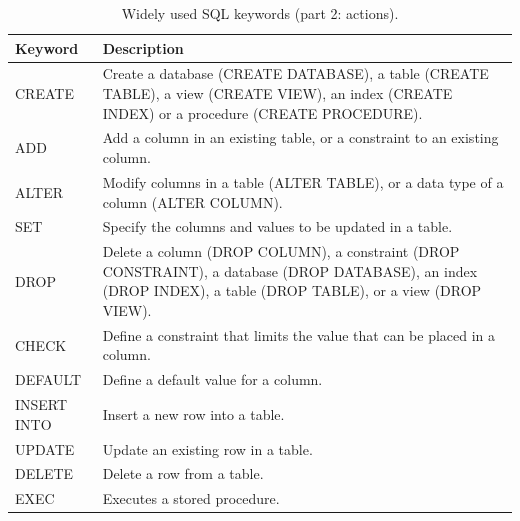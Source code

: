\begin{table}
	\centering \caption{Widely used SQL keywords (part 2: actions).}\label{ch:db:tab:sqlkeywords2}
	\begin{tabularx}{\textwidth}{lX}
		\hline
		Keyword & Description \\ \hline
		CREATE & Create a database (CREATE DATABASE), a table (CREATE TABLE), a view (CREATE VIEW), an index (CREATE INDEX) or a procedure (CREATE PROCEDURE). \\ \hdashline
		ADD & Add a column in an existing table, or a constraint to an existing column. \\ \hdashline
		ALTER & Modify columns in a table (ALTER TABLE), or a data type of a column (ALTER COLUMN). \\ \hdashline
		SET & Specify the columns and values to be updated in a table. \\ \hdashline
		DROP & Delete a column (DROP COLUMN), a constraint (DROP CONSTRAINT), a database (DROP DATABASE), an index (DROP INDEX), a table (DROP TABLE), or a view (DROP VIEW). \\ \hdashline
		CHECK & Define a constraint that limits the value that can be placed in a column. \\ \hdashline
		DEFAULT & Define a default value for a column. \\ \hdashline
		INSERT INTO & Insert a new row into a table. \\ \hdashline
		UPDATE & Update an existing row in a table. \\ \hdashline
		DELETE & Delete a row from a table. \\ \hdashline
		EXEC & Executes a stored procedure. \\ \hline
	\end{tabularx}
\end{table}

